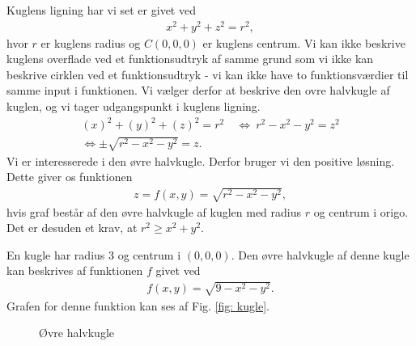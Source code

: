 \begin{exa}
	Kuglens ligning har vi set er givet ved
	\begin{align*}
		x^2 + y^2 + z^2 = r^2,
	\end{align*}
	hvor $r$ er kuglens radius og $C(0,0,0)$ er kuglens centrum. Vi kan ikke beskrive kuglens overflade ved et funktionsudtryk af samme grund som vi ikke kan beskrive 
	cirklen ved et funktionsudtryk - vi kan ikke have to funktionsværdier til samme input i funktionen. Vi vælger derfor at beskrive den ovre halvkugle af kuglen, og vi tager 
	udgangspunkt i kuglens ligning. 
	\begin{align*}
		(x)^2 + (y)^2 + (z)^2 = r^2 \ &\Leftrightarrow \ r^2 - x^2 - y^2 = z^2 \\
		\Leftrightarrow  \pm \sqrt{r^2-x^2-y^2} = z.
	\end{align*}
	Vi er interesserede i den øvre halvkugle. Derfor bruger vi den positive løsning. Dette giver os funktionen 
	\begin{align*}
		z=f(x,y) = \sqrt{r^2-x^2-y^2},
	\end{align*}
	hvis graf består af den øvre halvkugle af kuglen med radius $r$ og centrum i origo. Det er desuden et krav, at $r^2 \geq x^2+y^2$.
\end{exa}
\begin{exa}
	En kugle har radius 3 og centrum i $(0,0,0)$. Den øvre halvkugle af denne kugle kan beskrives af funktionen $f$ givet ved
	\begin{align*}
		f(x,y) = \sqrt{9-x^2-y^2}.
	\end{align*}
	Grafen for denne funktion kan ses af Fig. \ref{fig: kugle}.
	\begin{figure}[H]
		\centering
		\caption{Øvre halvkugle}
		\label{fig:kugle}
	\end{figure}
\end{exa}

